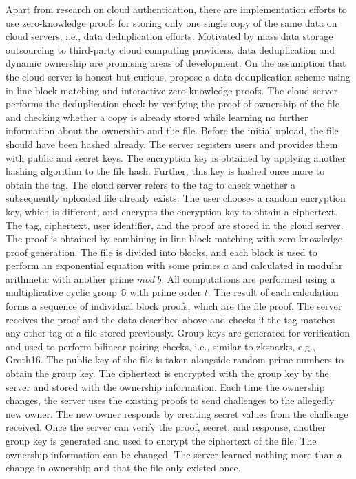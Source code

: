 Apart from research on cloud authentication, there are implementation efforts to use zero-knowledge proofs for storing only one single copy of the same data on cloud servers, i.e., data deduplication efforts. Motivated by mass data storage outsourcing to third-party cloud computing providers, data deduplication and dynamic ownership are promising areas of development. On the assumption that the cloud server is honest but curious, \citet{Kanagamani} propose a data deduplication scheme using in-line block matching and interactive zero-knowledge proofs. The cloud server performs the deduplication check by verifying the proof of ownership of the file and checking whether a copy is already stored while learning no further information about the ownership and the file. Before the initial upload, the file should have been hashed already. The server registers users and provides them with public and secret keys. The encryption key is obtained by applying another hashing algorithm to the file hash.
Further, this key is hashed once more to obtain the tag. The cloud server refers to the tag to check whether a subsequently uploaded file already exists. The user chooses a random encryption key, which is different, and encrypts the encryption key to obtain a ciphertext. The tag, ciphertext, user identifier, and the proof are stored in the cloud server. The proof is obtained by combining in-line block matching with zero knowledge proof generation. The file is divided into blocks, and each block is used to perform an exponential equation with some primes \(a\) and calculated in modular arithmetic with another prime \(mod \ b\). All computations are performed using a multiplicative cyclic group \begin{math} \mathbb{G} \end{math} with prime order \(t\). The result of each calculation forms a sequence of individual block proofs, which are the file proof. The server receives the proof and the data described above and checks if the tag matches any other tag of a file stored previously. Group keys are generated for verification and used to perform bilinear pairing checks, i.e., similar to \acrshort{zksnark}s, e.g., Groth16. The public key of the file is taken alongside random prime numbers to obtain the group key. The ciphertext is encrypted with the group key by the server and stored with the ownership information. Each time the ownership changes, the server uses the existing proofs to send challenges to the allegedly new owner. The new owner responds by creating secret values from the challenge received. Once the server can verify the proof, secret, and response, another group key is generated and used to encrypt the ciphertext of the file. The ownership information can be changed. The server learned nothing more than a change in ownership and that the file only existed once. 

